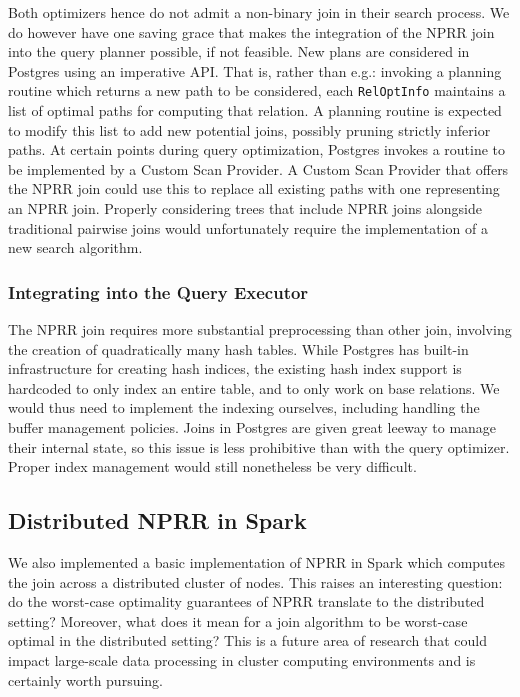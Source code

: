 Both optimizers hence do not admit a non-binary join in their search process. We do however have one saving grace that makes the integration of the NPRR
join into the query planner possible, if not feasible. New plans are considered in Postgres using an imperative API. That is,
rather than e.g.: invoking a planning routine which returns a new path
to be considered, each {\tt RelOptInfo} maintains a list of optimal paths
for computing that relation. A planning routine is expected to modify
this list to add new potential joins, possibly pruning strictly
inferior paths. At certain points during query optimization, Postgres
invokes a routine to be implemented by a Custom
Scan Provider. A Custom Scan Provider that offers the NPRR join could
use this to replace all existing paths with one representing an NPRR
join. Properly considering trees that include NPRR joins alongside
traditional pairwise joins would unfortunately require the
implementation of a new search algorithm.

\subsubsection{Integrating into the Query Executor}

The NPRR join requires more substantial preprocessing than other join,
involving the creation of quadratically many hash tables. While Postgres has built-in infrastructure for creating hash indices,
the existing hash index support is hardcoded to only index an entire
table, and to only work on base relations. We would thus need to
implement the indexing ourselves, including handling the buffer
management policies. Joins in Postgres are given great leeway to manage their internal
state, so this issue is less prohibitive than with the query
optimizer. Proper index management would still nonetheless be very difficult.

\subsection{Distributed NPRR in Spark}
We also implemented a basic implementation of NPRR in Spark which computes the join across a distributed cluster of nodes. This raises an interesting question: do the worst-case optimality guarantees of NPRR translate to the distributed setting? Moreover, what does it mean for a join algorithm to be worst-case optimal in the distributed setting? This is a future area of research that could impact large-scale data processing in cluster computing environments and is certainly worth pursuing.